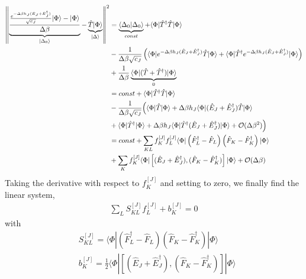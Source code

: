 \documentclass[prb,amsmath,amsfonts,amssymb]{revtex4}
\begin{document}
\begin{align}
	\left\|\underbrace{\frac{\frac{e^{-\Delta \beta h_J (\hat E_J + \hat E_J^\dag)}}{\sqrt{c_J}}|\Phi\rangle - |\Phi\rangle}{\Delta \beta}}_{|\Delta_0\rangle} - \underbrace{\hat T |\Phi\rangle}_{|\Delta\rangle} \right\|^2
	&= \underbrace{\langle \Delta_0|\Delta_0\rangle}_{const} + \langle \Phi|\hat T^\dag \hat T|\Phi\rangle \nonumber\\
	&- \frac{1}{\Delta \beta\sqrt{c_J}} \left(\langle \Phi|e^{-\Delta \beta h_J (\hat E_J +\hat E_J^\dag)}\hat T|\Phi\rangle  + \langle \Phi|\hat T^\dag e^{-\Delta \beta h_J (\hat E_J +\hat E_J^\dag)}|\Phi\rangle\right)\nonumber\\
	&+ \frac{1}{\Delta\beta} \underbrace{\langle \Phi | (\hat T + \hat T^\dag ) | \Phi\rangle}_0\nonumber\\
%
	&= const +  \langle \Phi|\hat T^\dag \hat T|\Phi\rangle \nonumber\\
	&- \frac{1}{\Delta \beta\sqrt{c_J}} \Bigl(\langle \Phi|\hat T|\Phi\rangle  + \Delta \beta h_J \langle \Phi|  (\hat E_J +\hat E_J^\dag) \hat T|\Phi\rangle\nonumber\\
	&+\langle \Phi|\hat T^\dag|\Phi\rangle  + \Delta \beta h_J\langle \Phi|\hat T^\dag(\hat E_J +\hat E_J^\dag)|\Phi\rangle + {\cal O}(\Delta \beta^2) \Bigr)\nonumber\\
%
	&= const +   \sum_{KL} f^{[J]}_K f^{[J]}_L \langle \Phi| \left( \hat F_L^\dag - \hat F_L\right)  \left( \hat F_K - \hat F_K^\dag\right) |\Phi\rangle\nonumber\\
	&+   \sum_K f^{[J]}_K 
	\langle \Phi| \left[(\hat E_J + \hat E_J^\dag), (\hat F_K-\hat F_K^\dag)\right]|\Phi\rangle + {\cal O}(\Delta\beta)
\end{align}
Taking the derivative with respect to $f^{[J]}_K$ and setting to zero, we finally find the linear system,
\begin{align}
	\sum_L S^{[J]}_{KL} f^{[J]}_L  + b^{[J]}_K= 0
\end{align}
with
\begin{align}
	& S_{KL}^{[J]} =\langle \Phi| \left( \hat F_L^\dag - \hat F_L\right)  \left( \hat F_K - \hat F_K^\dag\right) |\Phi\rangle
	\\
	&b^{[J]}_K = \frac{1}{2}\langle \Phi| \left[(\hat E_J + \hat E_J^\dag), (\hat F_K-\hat F_K^\dag)\right]|\Phi\rangle \nonumber\\
\end{align}
\end{document}
